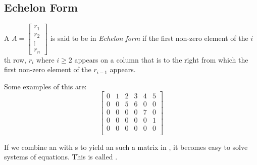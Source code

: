 \subsection{Echelon Form}\label{subsec:Echelon_Form}
\begin{theorem}\label{thm:Echelon_Form}
  A  $A =
  \begin{bmatrix}
    r_{1} \\
    r_{2} \\
    \vdots \\
    r_{n}
  \end{bmatrix}
  $ is said to be in \emph{Echelon form} if the first non-zero element of the $i$th row, $r_{i}$ where $i \geq 2$ appears on a column that is to the right from which the first non-zero element of the $r_{i-1}$ appears.

  Some examples of this are:
  \begin{equation*}
    \begin{bmatrix}
      0 & 1 & 2 & 3 & 4 & 5 \\
      0 & 0 & 5 & 6 & 0 & 0 \\
      0 & 0 & 0 & 0 & 7 & 0 \\
      0 & 0 & 0 & 0 & 0 & 1 \\
      0 & 0 & 0 & 0 & 0 & 0 \\
    \end{bmatrix}
  \end{equation*}
\end{theorem}

If we combine an  with s to yield an such a matrix in , it becomes easy to solve systems of equations.
This is called .

